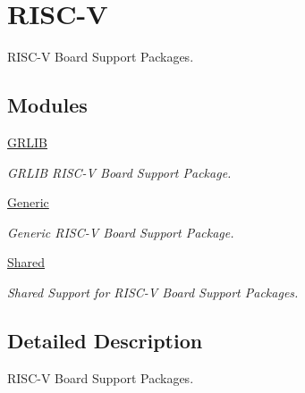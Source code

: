 \hypertarget{group__RTEMSBSPsRISCV}{}\section{R\+I\+S\+C-\/V}
\label{group__RTEMSBSPsRISCV}


R\+I\+S\+C-\/V Board Support Packages.  


\subsection*{Modules}
\begin{DoxyCompactItemize}
\item 
\mbox{\hyperlink{group__RTEMSBSPsRISCVGRLIB}{G\+R\+L\+IB}}
\begin{DoxyCompactList}\small\item\em G\+R\+L\+IB R\+I\+S\+C-\/V Board Support Package. \end{DoxyCompactList}\item 
\mbox{\hyperlink{group__RTEMSBSPsRISCVGeneric}{Generic}}
\begin{DoxyCompactList}\small\item\em Generic R\+I\+S\+C-\/V Board Support Package. \end{DoxyCompactList}\item 
\mbox{\hyperlink{group__RTEMSBSPsRISCVShared}{Shared}}
\begin{DoxyCompactList}\small\item\em Shared Support for R\+I\+S\+C-\/V Board Support Packages. \end{DoxyCompactList}\end{DoxyCompactItemize}


\subsection{Detailed Description}
R\+I\+S\+C-\/V Board Support Packages. 

